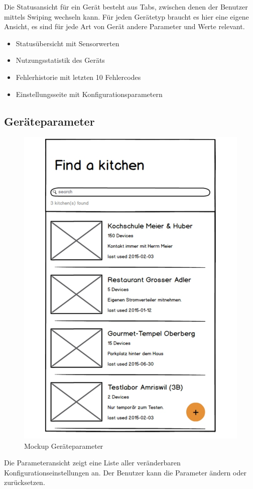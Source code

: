 Die Statusansicht für ein Gerät besteht aus Tabs, zwischen denen der Benutzer mittels Swiping wechseln kann. Für jeden Gerätetyp braucht es hier eine eigene Ansicht, es sind für jede Art von Gerät andere Parameter und Werte relevant.

\begin{itemize}
  \item Statusübersicht mit Sensorwerten
  \item Nutzungsstatistik des Geräts
  \item Fehlerhistorie mit letzten 10 Fehlercodes
  \item Einstellungsseite mit Konfigurationsparametern
\end{itemize}

\vspace{6cm}
\WFclear

\subsection{Geräteparameter}
\label{subsec:Geräteparameter}

\begin{figure}
	\begin{center}
		\includegraphics[page=6,trim=0 0 0 0,clip,scale=0.21]{uiux/res/mockups}
		\caption{Mockup Geräteparameter}
		\label{abb:mockDeviceParams}
	\end{center}
\end{figure}

Die Parameteransicht zeigt eine Liste aller veränderbaren Konfigurationseinstellungen an. Der Benutzer kann die Parameter ändern oder zurücksetzen.
